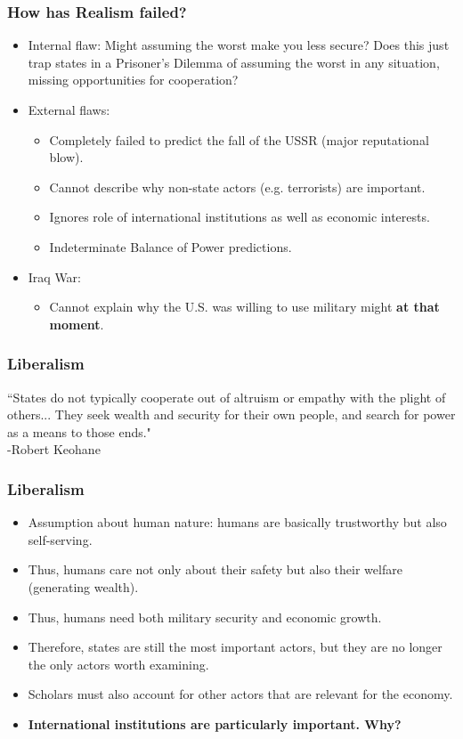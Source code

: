 \documentclass[handout]{beamer}
\begin{document}
\begin{frame} 
\frametitle{\LARGE{How has Realism failed?}}
\begin{itemize}
    \item Internal flaw: Might assuming the worst make you less secure? Does this just trap states in a Prisoner's Dilemma of assuming the worst in any situation, missing opportunities for cooperation? \pause
    \item External flaws: \pause
    \begin{itemize}
        \item Completely failed to predict the fall of the USSR (major reputational blow). \pause
        \item Cannot describe why non-state actors (e.g. terrorists) are important. \pause
        \item Ignores role of international institutions as well as economic interests. \pause
        \item Indeterminate Balance of Power predictions.
    \end{itemize}
    \item Iraq War: \pause 
    \begin{itemize}
        \item Cannot explain why the U.S. was willing to use military might \textbf{at that moment}. 
    \end{itemize}
\end{itemize}
\end{frame}


\begin{frame} 
\frametitle{\LARGE{Liberalism}}
``States do not typically cooperate out of altruism or empathy with the plight of others... They seek wealth and security for their own people, and search for power as a means to those ends." \\
\hspace*{160pt} -Robert Keohane
\end{frame}


\begin{frame} 
\frametitle{\LARGE{Liberalism}}
\begin{itemize}
    \item Assumption about human nature: \pause humans are basically trustworthy but also self-serving. \pause 
    \item Thus, humans care not only about their safety but also their welfare (generating wealth). \pause
    \item Thus, humans need both military security and economic growth. \pause
    \item Therefore, states are still the most important actors, but they are no longer the only actors worth examining.
    \item Scholars must also account for other actors that are relevant for the economy. \pause
    \item \textbf{International institutions are particularly important. Why?}
\end{itemize}
\end{frame}
\end{document}
